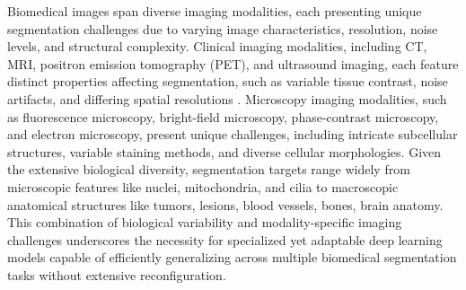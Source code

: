 \documentclass[./dissertation.tex]{subfiles}
\begin{document}
Biomedical images span diverse imaging modalities, each presenting unique segmentation challenges due to varying image characteristics, resolution, noise levels, and structural complexity. Clinical imaging modalities, including CT, MRI, positron emission tomography (PET), and ultrasound imaging, each feature distinct properties affecting segmentation, such as variable tissue contrast, noise artifacts, and differing spatial resolutions \cite{huang2022multi}. Microscopy imaging modalities, such as fluorescence microscopy, bright-field microscopy, phase-contrast microscopy, and electron microscopy, present unique challenges, including intricate subcellular structures, variable staining methods, and diverse cellular morphologies. Given the extensive biological diversity, segmentation targets range widely from microscopic features like nuclei, mitochondria, and cilia to macroscopic anatomical structures like tumors, lesions, blood vessels, bones, brain anatomy. This combination of biological variability and modality-specific imaging challenges underscores the necessity for specialized yet adaptable deep learning models \cite{isensee2021nnu} capable of efficiently generalizing across multiple biomedical segmentation tasks without extensive reconfiguration.
\end{document}

